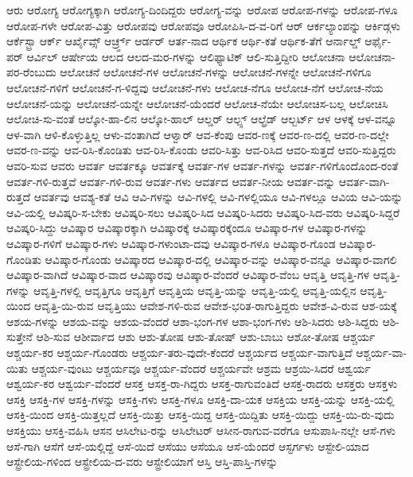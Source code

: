 {ಆರು
ಆರೋಗ್ಯ
ಆರೋಗ್ಯಕ್ಕಾಗಿ
ಆರೋಗ್ಯ-ದಿಂದಿದ್ದರು
ಆರೋಗ್ಯ-ವನ್ನು
ಆರೋಪ
ಆರೋಪ-ಗಳನ್ನು
ಆರೋಪ-ಗಳೂ
ಆರೋಪ-ಗಳೇ
ಆರೋಪ-ವಿತ್ತು
ಆರೋಪವು
ಆರೋಪವೂ
ಆರೋಪಿಸಿ-ದ-ವ-ರಿಗೆ
ಆರ್
ಆರ್ಕಲ್ಯಾಂಪನ್ನು
ಆರ್ಕಿಡ್ಗಳು
ಆರ್ಕೆಸ್ಟ್ರಾ
ಆರ್ಕ್
ಆರ್ಖೈವ್ಸ್
ಆರ್ಚ್ರ್ಡ್
ಆರ್ಡರ್
ಆರ್ತ-ನಾದ
ಆರ್ಥಿಕ
ಆರ್ಥಿ-ಕತೆ
ಆರ್ಥಿಕ-ತೆಗೆ
ಆರ್ನಾಲ್ಡ್
ಆರ್ಫೈ-ಪರ್
ಆರ್ವಿಲ್
ಆರ್ಷೇಯ
ಆಲದ
ಆಲದ-ಮರ-ಗಳನ್ನು
ಆಲಿಫ್ಯಾಟಿಕ್
ಆಲಿ-ಸುತ್ತಿದ್ದೀರಿ
ಆಲೋಚನಾ
ಆಲೋಚನಾ-ಪರ-ರೆಂಬುದು
ಆಲೋಚನೆ
ಆಲೋಚನೆ-ಗಳ
ಆಲೋಚನೆ-ಗಳನ್ನು
ಆಲೋಚನೆ-ಗಳನ್ನೇ
ಆಲೋಚನೆ-ಗಳಿಗೂ
ಆಲೋಚನೆ-ಗಳಿಗೆ
ಆಲೋಚನೆ-ಗ-ಳಿದ್ದವು
ಆಲೋಚನೆ-ಗಳು
ಆಲೋಚ-ನೆಗೂ
ಆಲೋಚ-ನೆಗೆ
ಆಲೋಚ-ನೆಯ
ಆಲೋಚನೆ-ಯನ್ನು
ಆಲೋಚನೆ-ಯನ್ನೇ
ಆಲೋಚನೆ-ಯೆಂದರೆ
ಆಲೋಚ-ನೆಯೇ
ಆಲೋಚಿಸ-ಬಲ್ಲ
ಆಲೋಚಿಸಿ
ಆಲೋಚಿ-ಸು-ವಂತೆ
ಆಲ್ಕೋ-ಹಾ-ಲಿನ
ಆಲ್ಕೋ-ಹಾಲ್
ಆಲ್ಡರ್
ಆಲ್ಪ್ಸ್
ಆಲ್ಫ್ರೆಡ್
ಆಲ್ಬರ್ಟ್
ಆಳ
ಆಳಕ್ಕೆ
ಆಳ-ವನ್ನೂ
ಆಳ-ವಾಗಿ
ಆಳಿ-ಕೊಳ್ಳುತ್ತಿಲ್ಲ
ಆಳು-ವಂತಾಗಿದೆ
ಆಳ್ವಾರ್
ಆವ-ಕೆಂಪು
ಆವರ-ಣಕ್ಕೆ
ಆವರ-ಣ-ದಲ್ಲಿ
ಆವರ-ಣ-ದಲ್ಲೇ
ಆವರ-ಣ-ವನ್ನು
ಆವ-ರಿಸಿ-ಕೊಂಡಿತು
ಆವ-ರಿಸಿ-ಕೊಂಡು
ಆವರಿ-ಸಿತ್ತು
ಆವ-ರಿಸಿದ
ಆವರಿ-ಸುತ್ತದೆ
ಆವರಿ-ಸುತ್ತಿದ್ದರು
ಆವರಿ-ಸುವ
ಆವರು
ಆವರ್ತ
ಆವರ್ತಕ್ಕೂ
ಆವರ್ತಕ್ಕೆ
ಆವರ್ತ-ಗಳ
ಆವರ್ತ-ಗಳನ್ನು
ಆವರ್ತ-ಗಳಿಗೊಂದೊಂದ-ರಂತೆ
ಆವರ್ತ-ಗಳಿ-ರುತ್ತವೆ
ಆವರ್ತ-ಗಳಿ-ರುವ
ಆವರ್ತ-ಗಳು
ಆವರ್ತದ
ಆವರ್ತ-ನೀಯ
ಆವರ್ತ-ವನ್ನು
ಆವರ್ತ-ವಾಗಿ-ರುತ್ತದೆ
ಆವರ್ತವು
ಆವಶ್ಯ-ಕತೆ
ಆವಿ
ಆವಿ-ಗಳನ್ನು
ಆವಿ-ಗಳಲ್ಲಿ
ಆವಿ-ಗಳಲ್ಲಿಯೂ
ಆವಿ-ಗಳಲ್ಲೂ
ಆವಿಯ
ಆವಿ-ಯನ್ನು
ಆವಿ-ಯಲ್ಲಿ
ಆವಿಷ್ಕರಿ-ಸ-ಬೇಕು
ಆವಿಷ್ಕರಿ-ಸಲು
ಆವಿಷ್ಕರಿ-ಸಿದ
ಆವಿಷ್ಕರಿ-ಸಿದರು
ಆವಿಷ್ಕರಿ-ಸಿದ-ವರು
ಆವಿಷ್ಕರಿ-ಸಿದ್ದರೆ
ಆವಿಷ್ಕರಿ-ಸಿದ್ದು
ಆವಿಷ್ಕಾರ
ಆವಿಷ್ಕಾರಕ್ಕಾಗಿ
ಆವಿಷ್ಕಾರಕ್ಕೆ
ಆವಿಷ್ಕಾರಕ್ಕೆಂದೂ
ಆವಿಷ್ಕಾರ-ಗಳ
ಆವಿಷ್ಕಾರ-ಗಳನ್ನು
ಆವಿಷ್ಕಾರ-ಗಳಿಗೆ
ಆವಿಷ್ಕಾರ-ಗಳು
ಆವಿಷ್ಕಾರ-ಗಳುಂಟಾ-ದವು
ಆವಿಷ್ಕಾರ-ಗಳೂ
ಆವಿಷ್ಕಾರ-ಗೊಂಡ
ಆವಿಷ್ಕಾರ-ಗೊಂಡಿತು
ಆವಿಷ್ಕಾರ-ಗೊಂಡು
ಆವಿಷ್ಕಾರದ
ಆವಿಷ್ಕಾರ-ದಲ್ಲಿ
ಆವಿಷ್ಕಾರ-ವನ್ನು
ಆವಿಷ್ಕಾರ-ವನ್ನೂ
ಆವಿಷ್ಕಾರ-ವಾಗಲಿ
ಆವಿಷ್ಕಾರ-ವಾಗಿದೆ
ಆವಿಷ್ಕಾರ-ವಾದ
ಆವಿಷ್ಕಾರವು
ಆವಿಷ್ಕಾರ-ವೆಂದರೆ
ಆವಿಷ್ಕಾರ-ವೆಂಬ
ಆವೃತ್ತಿ
ಆವೃತ್ತಿ-ಗಳ
ಆವೃತ್ತಿ-ಗಳನ್ನು
ಆವೃತ್ತಿ-ಗಳಲ್ಲಿ
ಆವೃತ್ತಿಗೂ
ಆವೃತ್ತಿಗೆ
ಆವೃತ್ತಿಯ
ಆವೃತ್ತಿ-ಯನ್ನು
ಆವೃತ್ತಿ-ಯಲ್ಲಿ
ಆವೃತ್ತಿ-ಯಲ್ಲಿನ
ಆವೃತ್ತಿ-ಯಿಂದ
ಆವೃತ್ತಿ-ಯಿ-ರುವ
ಆವೃತ್ತಿಯು
ಆವೇಶ-ಗಳಿ-ರುವ
ಆವೇಶ-ಭರಿತ-ರಾಗುತ್ತಿದ್ದರು
ಆವೇಶ-ವಿ-ರುವ
ಆಶ-ಯಕ್ಕೆ
ಆಶಯ-ಗಳನ್ನು
ಆಶಯ-ವನ್ನು
ಆಶಯ-ವೆಂದರೆ
ಆಶಾ-ಭಂಗ-ಗಳ
ಆಶಾ-ಭಂಗ-ಗಳು
ಆಶಿ-ಸಿದರು
ಆಶಿ-ಸಿದ್ದರು
ಆಶಿ-ಸುತ್ತೇನೆ
ಆಶಿ-ಸುವ
ಆಶೀರ್ವಾದ
ಆಶು
ಆಶು-ತೋಷ
ಆಶು-ತೋಷ್
ಆಶು-ಬಾಬು
ಆಶೋ-ತೋಷ
ಆಶ್ಚರ್ಯ
ಆಶ್ಚರ್ಯ-ಕರ
ಆಶ್ಚರ್ಯ-ಗೊಂಡರು
ಆಶ್ಚರ್ಯ-ತರು-ವುದೇ-ಕೆಂದರೆ
ಆಶ್ಚರ್ಯದ
ಆಶ್ಚರ್ಯ-ವಾಗುತ್ತಿದೆ
ಆಶ್ಚರ್ಯ-ವಾ-ಯಿತು
ಆಶ್ಚರ್ಯ-ವುಂಟು
ಆಶ್ಚರ್ಯವೂ
ಆಶ್ಚರ್ಯ-ವೆಂದರೆ
ಆಶ್ಚರ್ಯವೇ
ಆಶ್ರಮ
ಆಶ್ರಯಿ-ಸಿದರೆ
ಆಶ್ವರ್ಯ
ಆಶ್ವರ್ಯ-ಕರ
ಆಶ್ವರ್ಯ-ವೆಂದರೆ
ಆಸಕ್ತ
ಆಸಕ್ತ-ರಾ-ಗಿದ್ದರು
ಆಸಕ್ತ-ರಾಗುವಂತಿದೆ
ಆಸಕ್ತ-ರಾದರು
ಆಸಕ್ತರು
ಆಸಕ್ತಳು
ಆಸಕ್ತಿ
ಆಸಕ್ತಿ-ಗಳ
ಆಸಕ್ತಿ-ಗಳನ್ನು
ಆಸಕ್ತಿ-ಗಳು
ಆಸಕ್ತಿ-ಗಳೂ
ಆಸಕ್ತಿ-ದಾ-ಯಕ
ಆಸಕ್ತಿಯ
ಆಸಕ್ತಿ-ಯನ್ನು
ಆಸಕ್ತಿ-ಯಲ್ಲಿ
ಆಸಕ್ತಿ-ಯಿಂದ
ಆಸಕ್ತಿ-ಯಿತ್ತಲ್ಲದೆ
ಆಸಕ್ತಿ-ಯಿತ್ತು
ಆಸಕ್ತಿ-ಯಿದ್ದ
ಆಸಕ್ತಿ-ಯಿದ್ದಿತು
ಆಸಕ್ತಿ-ಯಿದ್ದು
ಆಸಕ್ತಿ-ಯಿ-ರು-ವುದು
ಆಸಕ್ತಿಯು
ಆಸಕ್ತಿ-ವಹಿಸಿ
ಆಸನ
ಆಸಿಲೇಟ-ರನ್ನು
ಆಸಿಲೇಟರ್
ಆಸೀನ-ರಾಗುವ-ವರೆಗೂ
ಆಸುಪಾಸಿ-ನಲ್ಲೇ
ಆಸೆ-ಗಳು
ಆಸೆ-ಗಾಗಿ
ಆಸೆಗೆ
ಆಸೆ-ಯಲ್ಲಿದ್ದೆ
ಆಸೆ-ಯಿದೆ
ಆಸೆಯು
ಆಸೆಯೂ
ಆಸೆ-ಯೆಂದರೆ
ಆಸ್ಟರ್ಗಳು
ಆಸ್ಟೇಲಿ-ಯಾದ
ಆಸ್ಟ್ರೇಲಿಯ-ಗಳಿಂದ
ಆಸ್ಟ್ರೇಲಿಯ-ದ-ವರು
ಆಸ್ಟ್ರೇಲಿಯಾಗೆ
ಆಸ್ತಿ
ಆಸ್ತಿ-ಪಾಸ್ತಿ-ಗಳನ್ನು
}
